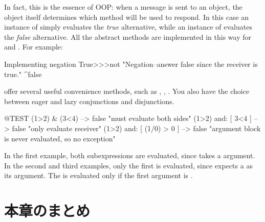 \documentclass[a4paper,10pt,twoside]{book}
\begin{document}
In fact, this is the essence of OOP: when a message is sent to an object, the object itself determines which method will be used to respond. In this case an instance of  simply evaluates the \emph{true} alternative, while an instance of  evaluates the \emph{false} alternative.  All the abstract  methods are implemented in this way for  and . For example:

\begin{method}{Implementing negation}
True>>>not
    "Negation--answer false since the receiver is true."
    ^false
\end{method}

 offer several useful convenience methods, such as , , . You also have the choice between eager and lazy conjunctions and disjunctions.

\begin{code}{@TEST}
(1>2) & (3<4)              --> false    "must evaluate both sides"
(1>2) and: [ 3<4 ]        --> false    "only evaluate receiver"
(1>2) and: [ (1/0) > 0 ] --> false    "argument block is never evaluated, so no exception"
\end{code}

In the first example, both  subexpressions are evaluated, since  takes a  argument.
In the second and third examples, only the first is evaluated, since  expects a  as its argument.  The  is evaluated only if the first argument is .


\section{本章のまとめ}
\end{document}
